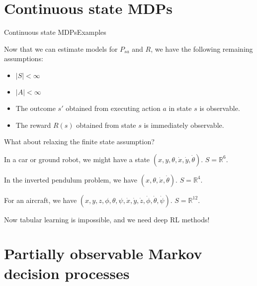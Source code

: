 \documentclass{beamer}
\def\Rset{\mathbb{R}}
\begin{document}
\section{Continuous state MDPs}

\begin{frame}{Continuous state MDPs}{Examples}

  Now that we can estimate models for $P_{sa}$ and $R$, we have
  the following remaining assumptions:
  \begin{itemize}
  \item $|S| < \infty$
  \item $|A| < \infty$
  \item The outcome $s'$ obtained from executing action $a$ in state
    $s$ is observable.
  \item The reward $R(s)$ obtained from state $s$ is immediately
    observable.
  \end{itemize}

  \medskip

  What about \alert{relaxing the finite state assumption}?

  \medskip

  In a car or ground robot, we might have a state
  $(x,y,\theta,\dot{x},\dot{y},\dot{\theta})$. $S = \Rset^6$.

  \medskip

  In the inverted pendulum problem, we have
  $(x,\theta,\dot{x},\dot{\theta})$. $S=\Rset^4$.

  \medskip

  For an aircraft, we have $(x,y,z,\phi,\theta,\psi,\dot{x},\dot{y},\dot{z},\dot{\phi},\dot{\theta},\dot{\psi})$. $S = \Rset^{12}$.

  \medskip

  Now tabular learning is impossible, and we need deep RL methods!

\end{frame}

\section{Partially observable Markov decision processes}
\end{document}
